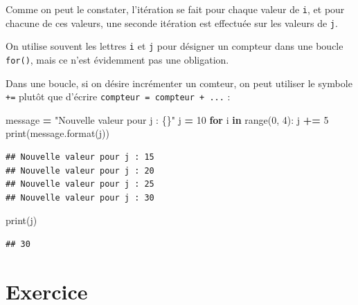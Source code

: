 \documentclass[12pt,]{book}
\newenvironment{Shaded}{\begin{snugshade}}{\end{snugshade}}
\newcommand{\KeywordTok}[1]{\textcolor[rgb]{0.13,0.29,0.53}{\textbf{#1}}}
\newcommand{\DecValTok}[1]{\textcolor[rgb]{0.00,0.00,0.81}{#1}}
\newcommand{\SpecialCharTok}[1]{\textcolor[rgb]{0.00,0.00,0.00}{#1}}
\newcommand{\StringTok}[1]{\textcolor[rgb]{0.31,0.60,0.02}{#1}}
\newcommand{\ControlFlowTok}[1]{\textcolor[rgb]{0.13,0.29,0.53}{\textbf{#1}}}
\newcommand{\OperatorTok}[1]{\textcolor[rgb]{0.81,0.36,0.00}{\textbf{#1}}}
\newcommand{\BuiltInTok}[1]{#1}
\newcommand{\NormalTok}[1]{#1}
\numberwithin{equation}{section}
\numberwithin{countremarque}{section}
\let\BeginKnitrBlock\begin \let\EndKnitrBlock\end
\begin{document}
Comme on peut le constater, l'itération se fait pour chaque valeur de
\texttt{i}, et pour chacune de ces valeurs, une seconde itération est
effectuée sur les valeurs de \texttt{j}.

\BeginKnitrBlock{remarque}
On utilise souvent les lettres \texttt{i} et \texttt{j} pour désigner un
compteur dans une boucle \texttt{for()}, mais ce n'est évidemment pas
une obligation.
\EndKnitrBlock{remarque}

Dans une boucle, si on désire incrémenter un comteur, on peut utiliser
le symbole \texttt{+=} plutôt que d'écrire
\texttt{compteur\ =\ compteur\ +\ ...} :

\begin{Shaded}
\begin{Highlighting}[]
\NormalTok{message }\OperatorTok{=} \StringTok{"Nouvelle valeur pour j : }\SpecialCharTok{\{\}}\StringTok{"}
\NormalTok{j }\OperatorTok{=} \DecValTok{10}
\ControlFlowTok{for}\NormalTok{ i }\KeywordTok{in} \BuiltInTok{range}\NormalTok{(}\DecValTok{0}\NormalTok{, }\DecValTok{4}\NormalTok{):}
\NormalTok{  j }\OperatorTok{+=} \DecValTok{5}
  \BuiltInTok{print}\NormalTok{(message.}\BuiltInTok{format}\NormalTok{(j))}
  
\end{Highlighting}
\end{Shaded}

\begin{lstlisting}
## Nouvelle valeur pour j : 15
## Nouvelle valeur pour j : 20
## Nouvelle valeur pour j : 25
## Nouvelle valeur pour j : 30
\end{lstlisting}

\begin{Shaded}
\begin{Highlighting}[]
\BuiltInTok{print}\NormalTok{(j)}
\end{Highlighting}
\end{Shaded}

\begin{lstlisting}
## 30
\end{lstlisting}

\section{Exercice}\label{exercice-5}
\end{document}
